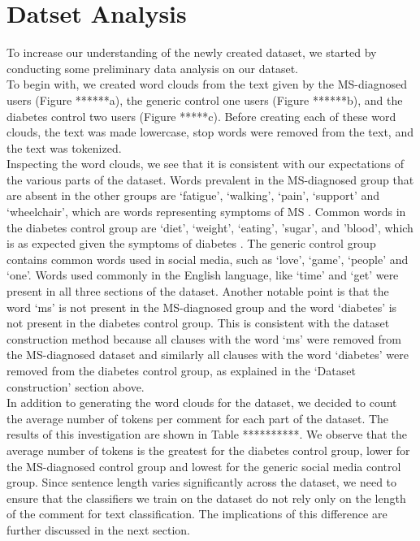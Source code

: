 \documentclass[11pt,a4paper]{article}
\begin{document}
\section{Datset Analysis}
To increase our understanding of the newly created dataset, we started by conducting some preliminary data analysis on our dataset. \\
\indent To begin with, we created word clouds from the text given by the MS-diagnosed users (Figure ******a), the generic control one users (Figure ******b), and the diabetes control two users (Figure *****c).  Before creating each of these word clouds, the text was made lowercase, stop words were removed from the text, and the text was tokenized. \\
\indent Inspecting the word clouds, we see that it is consistent with our expectations of the various parts of the dataset. Words prevalent in the MS-diagnosed group that are absent in the other groups are ‘fatigue’, ‘walking’, ‘pain’, ‘support’ and ‘wheelchair’, which are words representing symptoms of MS \citep{Gustavsen:21}. Common words in the diabetes control group are ‘diet’, ‘weight’, ‘eating’, 'sugar', and 'blood', which is as expected given the symptoms of diabetes \citep{Ramachandran:14}. The generic control group contains common words used in social media, such as ‘love’, ‘game’, ‘people’ and ‘one’. Words used commonly in the English language, like ‘time’ and ‘get’ were present in all three sections of the dataset. Another notable point is that the word ‘ms’ is not present in the MS-diagnosed group and the word ‘diabetes’ is not present in the diabetes control group. This is consistent with the dataset construction method because all clauses with the word ‘ms’ were removed from the MS-diagnosed dataset and similarly all clauses with the word ‘diabetes’ were removed from the diabetes control group, as explained in the ‘Dataset construction’ section above. \\
\indent In addition to generating the word clouds for the dataset, we decided to count the average number of tokens per comment for each part of the dataset. The results of this investigation are shown in Table **********. We observe that the average number of tokens is the greatest for the diabetes control group, lower for the MS-diagnosed control group and lowest for the generic social media control group. Since sentence length varies significantly across the dataset, we need to ensure that the classifiers we train on the dataset do not rely only on the length of the comment for text classification. The implications of this difference are further discussed in the next section.
\end{document}
